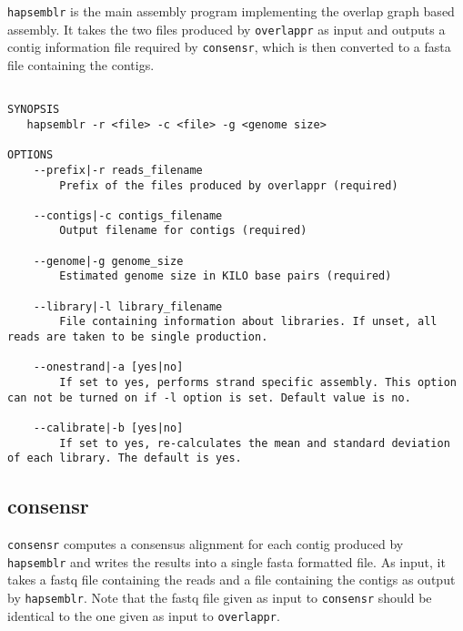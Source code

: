 \documentclass[12pt,a4paper]{report}
\begin{document}
\texttt{hapsemblr} is the main assembly program implementing the overlap graph based assembly. It takes the two files produced by \texttt{overlappr} as input and outputs a contig information file required by \texttt{consensr}, which is then converted to a fasta file containing the contigs.

\begin{lstlisting}

SYNOPSIS
   hapsemblr -r <file> -c <file> -g <genome size>

OPTIONS 
    --prefix|-r reads_filename 
        Prefix of the files produced by overlappr (required) 

    --contigs|-c contigs_filename 
        Output filename for contigs (required) 

    --genome|-g genome_size 
        Estimated genome size in KILO base pairs (required) 

    --library|-l library_filename 
        File containing information about libraries. If unset, all reads are taken to be single production. 

    --onestrand|-a [yes|no] 
        If set to yes, performs strand specific assembly. This option can not be turned on if -l option is set. Default value is no. 

    --calibrate|-b [yes|no] 
        If set to yes, re-calculates the mean and standard deviation of each library. The default is yes. 

\end{lstlisting}

\subsection{consensr}

\texttt{consensr} computes a consensus alignment for each contig produced by \texttt{hapsemblr} and writes the results into a single fasta formatted file. As input, it takes a fastq file containing the reads and a file containing the contigs as output by \texttt{hapsemblr}. Note that the fastq file given as input to \texttt{consensr} should be identical to the one given as input to \texttt{overlappr}.
\end{document}
